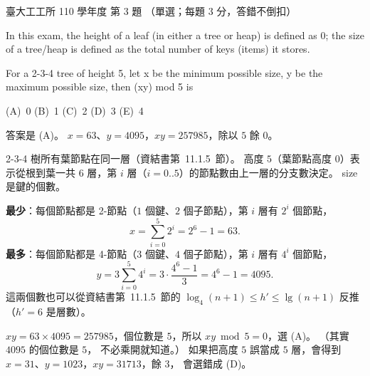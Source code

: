 \begin{pastexam}[label={px:ntu-110-ie-ds-03}]{臺大工工所 110 學年度 第 3 題}
（單選；每題 3 分，答錯不倒扣）

In this exam, the height of a leaf (in either a tree or heap) is defined as 0; the size of a tree/heap is
defined as the total number of keys (items) it stores.

For a 2-3-4 tree of height 5, let x be the minimum possible size, y be the maximum possible size, then
(xy) mod 5 is

(A)~0 \qquad (B)~1 \qquad (C)~2 \qquad (D)~3 \qquad (E)~4
\end{pastexam}

\begin{pastsoln}
答案是 (A)。 $x = 63$、$y = 4095$，$xy = 257985$，除以 $5$ 餘 $0$。

2-3-4 樹所有葉節點在同一層（資結書第~11.1.5~節）。 高度 $5$（葉節點高度 $0$）表示從根到葉一共
$6$ 層，第 $i$ 層（$i = 0..5$）的節點數由上一層的分支數決定。 size 是鍵的個數。

\textbf{最少}：每個節點都是 2-節點（$1$ 個鍵、$2$ 個子節點），第 $i$ 層有 $2^i$ 個節點，
\[
  x = \sum_{i=0}^{5} 2^i = 2^6 - 1 = 63 .
\]
\textbf{最多}：每個節點都是 4-節點（$3$ 個鍵、$4$ 個子節點），第 $i$ 層有 $4^i$ 個節點，
\[
  y = 3 \sum_{i=0}^{5} 4^i = 3 \cdot \frac{4^6 - 1}{3} = 4^6 - 1 = 4095 .
\]
這兩個數也可以從資結書第~11.1.5~節的 $\log_4(n + 1) \le h' \le \lg(n + 1)$ 反推（$h' = 6$ 是層數）。

$xy = 63 \times 4095 = 257985$，個位數是 $5$，所以 $xy \bmod 5 = 0$，選 (A)。 （其實 $4095$ 的個位數是 $5$，
不必乘開就知道。） 如果把高度 $5$ 誤當成 $5$ 層，會得到 $x = 31$、$y = 1023$，$xy = 31713$，餘 $3$，
會選錯成 (D)。
\end{pastsoln}
